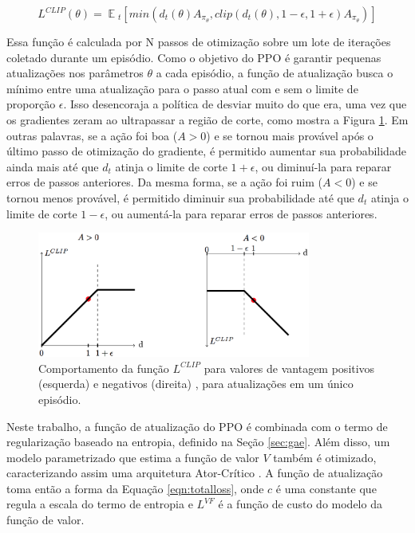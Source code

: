 \begin{equation}
\label{eqn:ppoloss}
L^{CLIP}(\theta) = \mathop{{}\mathbb{E}}{}_t [min(d_t(\theta)A_{\pi_\theta}, clip(d_t(\theta), 1-\epsilon, 1+\epsilon) A_{\pi_\theta})]
\end{equation}

Essa função é calculada por N passos de otimização sobre um lote de iterações coletado durante um episódio. Como o objetivo do PPO é garantir pequenas atualizações nos parâmetros $\theta$ a cada episódio, a função de atualização busca o mínimo entre uma atualização para o passo atual com e sem o limite de proporção $\epsilon$. Isso desencoraja a política de desviar muito do que era, uma vez que os gradientes zeram ao ultrapassar a região de corte, como mostra a Figura \ref{fig:ppoclip}. Em outras palavras, se a ação foi boa ($A > 0$) e se tornou mais provável após o último passo de otimização do gradiente, é permitido aumentar sua probabilidade ainda mais até que $d_t$ atinja o limite de corte $1+\epsilon$, ou diminuí-la para reparar erros de passos anteriores. Da mesma forma, se a ação foi ruim ($A < 0$) e se tornou menos provável, é permitido diminuir sua probabilidade até que $d_t$ atinja o limite de corte $1-\epsilon$, ou aumentá-la para reparar erros de passos anteriores.

\begin{figure}[ht]
 \centering
  \includegraphics[width=0.8\textwidth]{./fig/ppo_clip}
  \captionsetup{width=1\textwidth}
  \caption{Comportamento da função $L^{CLIP}$ para valores de vantagem positivos (esquerda) e negativos (direita) \cite{ppo}, para atualizações em um único episódio.}
 \label{fig:ppoclip}
\end{figure}

Neste trabalho, a função de atualização do PPO é combinada com o termo de regularização baseado na entropia, definido na Seção \ref{sec:gae}. Além disso, um modelo parametrizado que estima a função de valor $V$ também é otimizado, caracterizando assim uma arquitetura Ator-Crítico \cite{suttonbarto}. A função de atualização toma então a forma da Equação \ref{eqn:totalloss}, onde $c$ é uma constante que regula a escala do termo de entropia e $L^{VF}$ é a função de custo do modelo da função de valor.

